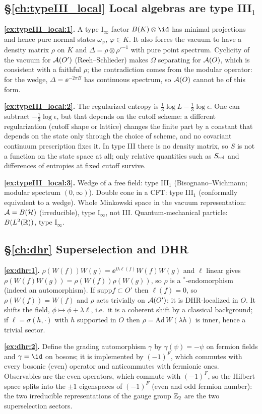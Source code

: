 {\subsection*{\S\ref{ch:typeIII_local} Local algebras are type III$_1$}
\textbf{\ref{ex:typeIII_local:1}.} A type I$_\infty$ factor $B(K)\otimes\id$ has minimal projections and hence pure normal states $\omega_\varphi$, $\varphi\in K$. It also forces the vacuum to have a density matrix $\rho$ on $K$ and $\Delta=\rho\otimes\rho'^{-1}$ with pure point spectrum. Cyclicity of the vacuum for $\mathcal{A}(O')$ (Reeh--Schlieder) makes $\Omega$ separating for $\mathcal{A}(O)$, which is consistent with a faithful $\rho$; the contradiction comes from the modular operator: for the wedge, $\Delta=\ee^{-2\pi B}$ has continuous spectrum, so $\mathcal{A}(O)$ cannot be of this form.\par
\textbf{\ref{ex:typeIII_local:2}.} The regularized entropy is $\frac13\log L-\frac13\log\epsilon$. One can subtract $-\frac13\log\epsilon$, but that depends on the cutoff scheme: a different regularization (cutoff shape or lattice) changes the finite part by a constant that depends on the state only through the choice of scheme, and no covariant continuum prescription fixes it. In type III there is no density matrix, so $S$ is not a function on the state space at all; only relative quantities such as $S_{\rm rel}$ and differences of entropies at fixed cutoff survive.\par
\textbf{\ref{ex:typeIII_local:3}.} Wedge of a free field: type III$_1$ (Bisognano--Wichmann; modular spectrum $(0,\infty)$). Double cone in a CFT: type III$_1$ (conformally equivalent to a wedge). Whole Minkowski space in the vacuum representation: $\mathcal{A}=B(\mathcal{H})$ (irreducible), type I$_\infty$, not III. Quantum-mechanical particle: $B(L^2(\mathbb{R}))$, type I$_\infty$.\par

\subsection*{\S\ref{ch:dhr} Superselection and DHR}
\textbf{\ref{ex:dhr:1}.} $\rho(W(f))W(g)=\ee^{\ii\lambda\ell(f)}W(f)W(g)$ and $\ell$ linear gives $\rho(W(f)W(g))=\rho(W(f))\rho(W(g))$, so $\rho$ is a $^*$-endomorphism (indeed an automorphism). If $\mathrm{supp}f\subset O'$ then $\ell(f)=0$, so $\rho(W(f))=W(f)$ and $\rho$ acts trivially on $\mathcal{A}(O')$: it is DHR-localized in $O$. It shifts the field, $\phi\mapsto\phi+\lambda\ell$, i.e.\ it is a coherent shift by a classical background; if $\ell=\sigma(h,\cdot)$ with $h$ supported in $O$ then $\rho=\mathrm{Ad}\,W(\lambda h)$ is inner, hence a trivial sector.\par
\textbf{\ref{ex:dhr:2}.} Define the grading automorphism $\gamma$ by $\gamma(\psi)=-\psi$ on fermion fields and $\gamma=\id$ on bosons; it is implemented by $(-1)^F$, which commutes with every bosonic (even) operator and anticommutes with fermionic ones. Observables are the even operators, which commute with $(-1)^F$, so the Hilbert space splits into the $\pm1$ eigenspaces of $(-1)^F$ (even and odd fermion number): the two irreducible representations of the gauge group $\mathbb{Z}_2$ are the two superselection sectors.\par

}
